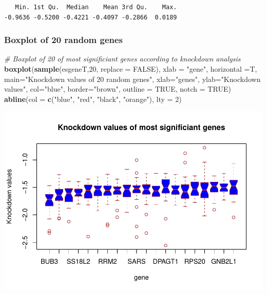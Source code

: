 \documentclass[]{article}
\newenvironment{Shaded}{\begin{snugshade}}{\end{snugshade}}
\newcommand{\KeywordTok}[1]{\textcolor[rgb]{0.13,0.29,0.53}{\textbf{#1}}}
\newcommand{\DataTypeTok}[1]{\textcolor[rgb]{0.13,0.29,0.53}{#1}}
\newcommand{\DecValTok}[1]{\textcolor[rgb]{0.00,0.00,0.81}{#1}}
\newcommand{\StringTok}[1]{\textcolor[rgb]{0.31,0.60,0.02}{#1}}
\newcommand{\CommentTok}[1]{\textcolor[rgb]{0.56,0.35,0.01}{\textit{#1}}}
\newcommand{\OtherTok}[1]{\textcolor[rgb]{0.56,0.35,0.01}{#1}}
\newcommand{\NormalTok}[1]{#1}
\begin{document}
\begin{verbatim}
   Min. 1st Qu.  Median    Mean 3rd Qu.    Max. 
-0.9636 -0.5200 -0.4221 -0.4097 -0.2866  0.0189 
\end{verbatim}

\subsubsection{Boxplot of 20 random
genes}\label{boxplot-of-20-random-genes}

\begin{Shaded}
\begin{Highlighting}[]
\CommentTok{# Boxplot of 20 of most significiant genes according to knockdown analysis}
\KeywordTok{boxplot}\NormalTok{(}\KeywordTok{sample}\NormalTok{(esgeneT,}\DecValTok{20}\NormalTok{, }\DataTypeTok{replace =} \OtherTok{FALSE}\NormalTok{), }\DataTypeTok{xlab =} \StringTok{"gene"}\NormalTok{, }\DataTypeTok{horizontal =}\NormalTok{T, }\DataTypeTok{main=}\StringTok{"Knockdown values of 20 random genes"}\NormalTok{,}
        \DataTypeTok{xlab=}\StringTok{"genes"}\NormalTok{,}
        \DataTypeTok{ylab=}\StringTok{"Knockdown values"}\NormalTok{,}
        \DataTypeTok{col=}\StringTok{"blue"}\NormalTok{,}
        \DataTypeTok{border=}\StringTok{"brown"}\NormalTok{,}
        \DataTypeTok{outline =} \OtherTok{TRUE}\NormalTok{,}
        \DataTypeTok{notch =} \OtherTok{TRUE}\NormalTok{)}
\KeywordTok{abline}\NormalTok{(}\DataTypeTok{col =} \KeywordTok{c}\NormalTok{(}\StringTok{"blue"}\NormalTok{, }\StringTok{"red"}\NormalTok{, }\StringTok{"black"}\NormalTok{, }\StringTok{"orange"}\NormalTok{),}
        \DataTypeTok{lty =} \DecValTok{2}\NormalTok{)}
\end{Highlighting}
\end{Shaded}

\includegraphics{Project_HNC_files/figure-latex/1_knockdown_boxplot-1.pdf}
\end{document}

